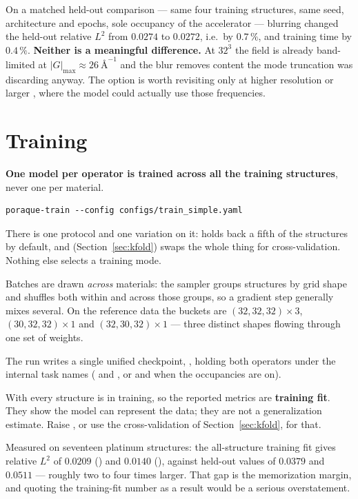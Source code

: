 \begin{pnote}
On a matched held-out comparison --- same four training structures, same seed,
architecture and epochs, sole occupancy of the accelerator --- blurring changed
the held-out relative $L^2$ from $0.0274$ to $0.0272$, i.e.\ by $0.7\,\%$, and
training time by $0.4\,\%$. \textbf{Neither is a meaningful difference.} At
$32^3$ the field is already band-limited at $|G|_{\max}\approx26\ \text{\AA}^{-1}$
and the blur removes content the mode truncation was discarding anyway. The
option is worth revisiting only at higher resolution or larger ,
where the model could actually use those frequencies.
\end{pnote}

\section{Training}
\label{sec:universal}

\textbf{One model per operator is trained across all the training structures},
never one per material.

\begin{lstlisting}
poraque-train --config configs/train_simple.yaml
\end{lstlisting}

There is one protocol and one variation on it: 
holds back a fifth of the structures by default, and
 (Section~\ref{sec:kfold}) swaps the whole thing for cross-validation. Nothing
else selects a training mode.

Batches are drawn \emph{across} materials: the sampler groups structures by
grid shape and shuffles both within and across those groups, so a gradient step
generally mixes several. On the reference data the buckets are
$(32,32,32)\times3$, $(30,32,32)\times1$ and $(32,30,32)\times1$ --- three
distinct shapes flowing through one set of weights.

The run writes a single unified checkpoint,
, holding both operators under the internal
task names ( and , or  and
 when the occupancies are on).

\begin{pwarn}
With  every structure is in training, so the reported
metrics are \textbf{training fit}. They show the model can represent the data;
they are not a generalization estimate. Raise , or use the
cross-validation of Section~\ref{sec:kfold}, for that.

Measured on seventeen platinum structures: the all-structure training fit gives
relative $L^2$ of $0.0209$ () and $0.0140$ (),
against held-out values of $0.0379$ and $0.0511$ --- roughly two to four times
larger. That gap is the memorization margin, and quoting the training-fit
number as a result would be a serious overstatement.
\end{pwarn}

